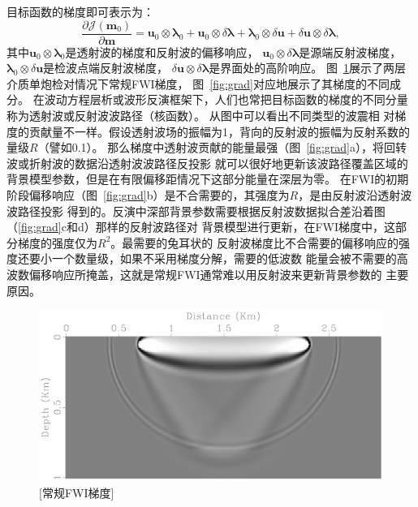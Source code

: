 目标函数的梯度即可表示为：
\begin{equation}
	\frac{\partial\mathcal{J}(\mathbf{m}_0)}{\partial\mathbf{m}} = \mathbf{u}_0\otimes\mathbf{\lambda}_0
	+\mathbf{u}_0\otimes\delta\mathbf{\lambda}+\mathbf{\lambda}_0\otimes\delta\mathbf{u}
	+\delta\mathbf{u}\otimes\delta\mathbf{\lambda},
	\label{eq:grad_ch3}
\end{equation}
其中$\mathbf{u}_0\otimes\mathbf{\lambda}_0$是透射波的梯度和反射波的偏移响应，
$\mathbf{u}_0\otimes\delta\mathbf{\lambda}$是源端反射波梯度，
$\mathbf{\lambda}_0\otimes\delta\mathbf{u}$是检波点端反射波梯度，
$\delta\mathbf{u}\otimes\delta\mathbf{\lambda}$是界面处的高阶响应。
图~\ref{fig:grad_full}展示了两层介质单炮检对情况下常规FWI梯度，
图~\ref{fig:grad}对应地展示了其梯度的不同成分。
在波动方程层析或波形反演框架下，人们也常把目标函数的梯度的不同分量称为透射波或反射波波路径（核函数）。
从图中可以看出不同类型的波震相
对梯度的贡献量不一样。假设透射波场的振幅为1，背向的反射波的振幅为反射系数的量级$R$（譬如0.1）。
那么梯度中透射波贡献的能量最强（图~\ref{fig:grad}a），将回转波或折射波的数据沿透射波波路径反投影
就可以很好地更新该波路径覆盖区域的背景模型参数，但是在有限偏移距情况下这部分能量在深层为零。
在FWI的初期阶段偏移响应（图~\ref{fig:grad}b）是不合需要的，其强度为$R$，是由反射波沿透射波波路径投影
得到的。反演中深部背景参数需要根据反射波数据拟合差沿着图（\ref{fig:grad}c和d）那样的反射波路径对
背景模型进行更新，在FWI梯度中，这部分梯度的强度仅为$R^2$。最需要的兔耳状的
反射波梯度比不合需要的偏移响应的强度还要小一个数量级，如果不采用梯度分解，需要的低波数
能量会被不需要的高波数偏移响应所掩盖，这就是常规FWI通常难以用反射波来更新背景参数的
主要原因。

\begin{figure}[!htbp]
	\centering
	\includegraphics[width=0.95\linewidth]{figure/grad_full}
	[常规FWI梯度]
	\label{fig:grad_full}
\end{figure}

